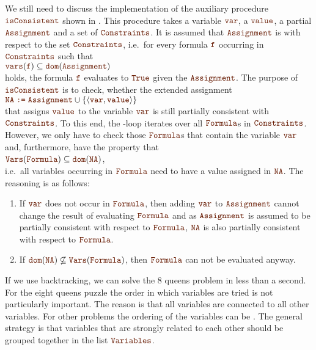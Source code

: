 We still need to discuss the implementation of the auxiliary procedure $\mytt{isConsistent}$
shown in .  This procedure takes a variable $\mytt{var}$, a $\mytt{value}$, a partial 
$\mytt{Assignment}$ and a set of $\mytt{Constraints}$.  It is assumed that $\mytt{Assignment}$ is
 with respect to the set $\mytt{Constraints}$, i.e.~for every formula $\mytt{f}$
occurring in $\mytt{Constraints}$ such that
\\[0.2cm]
\hspace*{1.3cm}
$\mytt{vars}(\mytt{f}) \subseteq \mytt{dom}(\mytt{Assignment})$
\\[0.2cm]
holds, the formula $\mytt{f}$ evaluates to $\mytt{True}$ given the $\mytt{Assignment}$.  The purpose of
$\mytt{isConsistent}$ is to check, whether the extended assignment
\\[0.2cm]
\hspace*{1.3cm}
$\mytt{NA} \;\mytt{:=}\;\mytt{Assignment} \cup \{ \pair(\mytt{var}, \mytt{value}) \}$
\\[0.2cm]
that assigns $\mytt{value}$ to the variable $\mytt{var}$ is still partially consistent with $\mytt{Constraints}$. 
To this end, the -loop iterates over all $\mytt{Formula}$s in $\mytt{Constraints}$. 
However, we only have to check those $\mytt{Formula}$s that contain the variable $\mytt{var}$ and,
furthermore, have the property that
\\[0.2cm]
\hspace*{1.3cm}
$\mytt{Vars}(\mytt{Formula}) \subseteq \mytt{dom}(\mytt{NA})$,
\\[0.2cm]
i.e.~all variables occurring in $\mytt{Formula}$ need to have a value assigned in
$\mytt{NA}$.  The reasoning is as follows:
\begin{enumerate}
\item If $\mytt{var}$ does not occur in $\mytt{Formula}$, then adding $\mytt{var}$ to
      $\mytt{Assignment}$ cannot change the result of evaluating $\mytt{Formula}$ and as
      $\mytt{Assignment}$ is assumed to be partially consistent with respect to $\mytt{Formula}$, 
      $\mytt{NA}$ is also partially consistent with respect to $\mytt{Formula}$.
\item If $\mytt{dom}(\mytt{NA}) \not\subseteq \mytt{Vars}(\mytt{Formula})$, then $\mytt{Formula}$ can not be evaluated anyway. 
\end{enumerate}
If we use backtracking, we can solve the 8 queens problem in less than a second.
For the eight queens puzzle the order in which variables are tried is not particularly important.  The reason
is that all variables are connected to all other variables.  For other problems the ordering of the variables
can be .  The general strategy is that variables that are strongly related to each other should
be grouped together in the list $\mytt{Variables}$.

